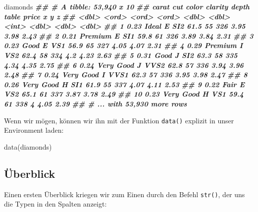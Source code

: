 \documentclass[11pt,german,a4paper]{article}
\newenvironment{Shaded}{\begin{snugshade}}{\end{snugshade}}
\newcommand{\DocumentationTok}[1]{\textcolor[rgb]{0.56,0.35,0.01}{\textbf{\textit{#1}}}}
\newcommand{\FunctionTok}[1]{\textcolor[rgb]{0.00,0.00,0.00}{#1}}
\newcommand{\NormalTok}[1]{#1}
\begin{document}
\begin{Shaded}
\begin{Highlighting}[]
\NormalTok{diamonds}
\DocumentationTok{\#\# \# A tibble: 53,940 x 10}
\DocumentationTok{\#\#    carat cut       color clarity depth table price     x     y     z}
\DocumentationTok{\#\#    \textless{}dbl\textgreater{} \textless{}ord\textgreater{}     \textless{}ord\textgreater{} \textless{}ord\textgreater{}   \textless{}dbl\textgreater{} \textless{}dbl\textgreater{} \textless{}int\textgreater{} \textless{}dbl\textgreater{} \textless{}dbl\textgreater{} \textless{}dbl\textgreater{}}
\DocumentationTok{\#\#  1  0.23 Ideal     E     SI2      61.5    55   326  3.95  3.98  2.43}
\DocumentationTok{\#\#  2  0.21 Premium   E     SI1      59.8    61   326  3.89  3.84  2.31}
\DocumentationTok{\#\#  3  0.23 Good      E     VS1      56.9    65   327  4.05  4.07  2.31}
\DocumentationTok{\#\#  4  0.29 Premium   I     VS2      62.4    58   334  4.2   4.23  2.63}
\DocumentationTok{\#\#  5  0.31 Good      J     SI2      63.3    58   335  4.34  4.35  2.75}
\DocumentationTok{\#\#  6  0.24 Very Good J     VVS2     62.8    57   336  3.94  3.96  2.48}
\DocumentationTok{\#\#  7  0.24 Very Good I     VVS1     62.3    57   336  3.95  3.98  2.47}
\DocumentationTok{\#\#  8  0.26 Very Good H     SI1      61.9    55   337  4.07  4.11  2.53}
\DocumentationTok{\#\#  9  0.22 Fair      E     VS2      65.1    61   337  3.87  3.78  2.49}
\DocumentationTok{\#\# 10  0.23 Very Good H     VS1      59.4    61   338  4     4.05  2.39}
\DocumentationTok{\#\# \# ... with 53,930 more rows}
\end{Highlighting}
\end{Shaded}

Wenn wir mögen, können wir ihn mit der Funktion \texttt{data()} explizit in unser Environment laden:

\begin{Shaded}
\begin{Highlighting}[]
\FunctionTok{data}\NormalTok{(diamonds)}
\end{Highlighting}
\end{Shaded}

\hypertarget{uxfcberblick}{%
\subsection{Überblick}\label{uxfcberblick}}

Einen ersten Überblick kriegen wir zum Einen durch den Befehl \texttt{str()}, der uns die Typen in den Spalten anzeigt:
\end{document}
